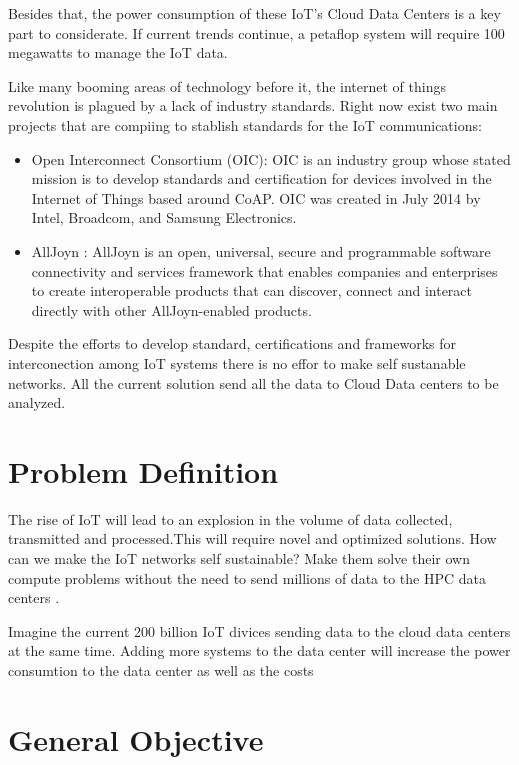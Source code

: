 Besides that, the power consumption of these  IoT’s Cloud Data Centers is a key
part to considerate. If current trends continue, a petaflop system will require 
100 megawatts to manage the IoT data. 

Like many booming areas of technology before it, the internet of things
revolution is plagued by a lack of industry standards. Right now exist two main 
projects that are compiing to stablish standards for the IoT communications: 

\begin{itemize}
\item Open Interconnect Consortium (OIC): OIC is an industry group whose stated 
mission is to develop standards and certification for devices involved in the 
Internet of Things based around CoAP. OIC was created in July 2014 by Intel, 
Broadcom, and Samsung Electronics.
\item AllJoyn : AllJoyn is an open, universal, secure and programmable software 
connectivity and services framework that enables companies and enterprises to 
create interoperable products that can discover, connect and interact directly 
with other AllJoyn-enabled products.
\end{itemize}

Despite the efforts to develop standard, certifications and frameworks for 
interconection among IoT systems there is no effor to make self sustanable 
networks. All the current solution send all the data to Cloud Data centers to be 
analyzed. 

\section{Problem Definition}
\noindent

The rise of IoT will lead to an explosion in the volume of data collected, 
transmitted and processed.This will require novel and optimized solutions. 
How can we make the IoT networks self sustainable? Make them solve their own compute problems 
without the need to send millions of data to the HPC data centers . 

Imagine the current 200 billion IoT divices sending data to the cloud data 
centers at the same time. Adding more systems to the data center will increase 
the power consumtion to the data center as well as the costs

\section{General Objective}
\noindent

